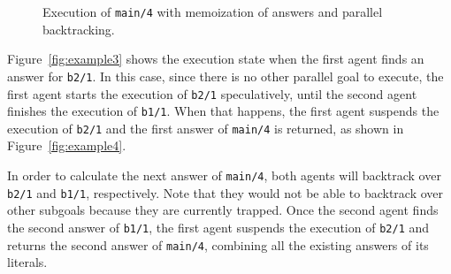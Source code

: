 \documentclass{tlp}
\newcommand{\compressfigure}{\vspace{-1em}}
\begin{document}
\begin{figure}[tb]
  \caption{Execution of \lstinline{main/4} with memoization of
    answers and parallel backtracking.}
  \label{fig:example}
\compressfigure
\end{figure}


Figure~\ref{fig:example3} shows the execution state when the first
agent finds an answer for \lstinline{b2/1}. In this case, since there is
no other parallel goal to execute, the first agent starts the
execution of \lstinline{b2/1} speculatively, until the second agent
finishes the execution of \lstinline{b1/1}. When that happens, the first
agent suspends the execution of \lstinline{b2/1} and the first answer of
\lstinline{main/4} is returned, as shown in Figure~\ref{fig:example4}.

In order to calculate the next answer of \lstinline{main/4}, both
agents will backtrack over \lstinline{b2/1} and \lstinline{b1/1},
respectively. Note that they would not be able to backtrack over other
subgoals because they are currently trapped.
Once the second agent
finds the second answer of \lstinline{b1/1}, the first agent suspends
the execution of \lstinline{b2/1} and returns the second answer of
\lstinline{main/4}, combining all the existing answers of its
literals.
\end{document}
